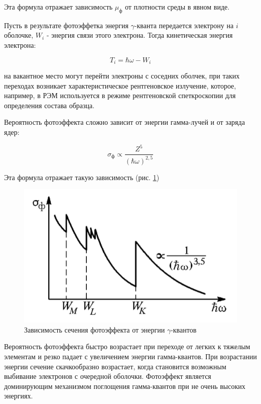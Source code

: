 \documentclass[a4paper]{article}
\begin{document}
Эта формула отражает зависимость $\mu_ф$ от плотности среды в явном виде.\par 

Пусть в результате фотоэффетка энергия $\gamma$-кванта передается электрону на $i$ оболочке, 
$W_i$ - энергия связи этого электрона. Тогда кинетическая энергия электрона:

\begin{equation}
    T_i = \hbar \omega - W_i
\end{equation}

на вакантное место могут перейти электроны с соседних оболчек, при таких переходах возникает характеристическое 
рентгеновское излучение, которое, например, в РЭМ используется в режиме рентгеновской спеткроскопии для определения 
состава образца. \par 

Вероятность фотоэффекта сложно зависит от энергии гамма-лучей и от заряда ядер:

\begin{equation}
    \sigma_ф \propto \frac{Z^5}{(\hbar \omega)^{2,5}}
\end{equation}

Эта формула отражает такую зависимость (рис. \ref{p1})

\begin{figure}[H]
    \begin{center}
    \includegraphics[scale = 0.8]{p1.png}
    \caption{Зависимость сечения фотоэффекта от энергии $\gamma$-квантов}
    \label{p1}
    \end{center}
\end{figure}

Вероятность фотоэффекта быстро возрастает при переходе от легких к тяжелым элементам и резко падает
с увеличением энергии гамма-квантов. При возрастании энергии сечение скачкообразно возрастает, когда 
становится возможным выбивание электронов с очередной оболочки. Фотоэффект является доминирующим механизмом
поглощения гамма-квантов при не очень высоких энергиях.
\end{document}
